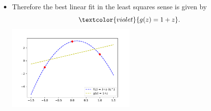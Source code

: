 {\begin{enumerate}
\begin{itemize}
			\item 
			Therefore the best linear fit in the least squares sense is given by
			$$
			\textcolor{violet}{g(z) = 1+z}.
			$$
			\includegraphics[width=0.5\textwidth]{regression.pdf}
		\end{itemize}
	\end{enumerate}
}